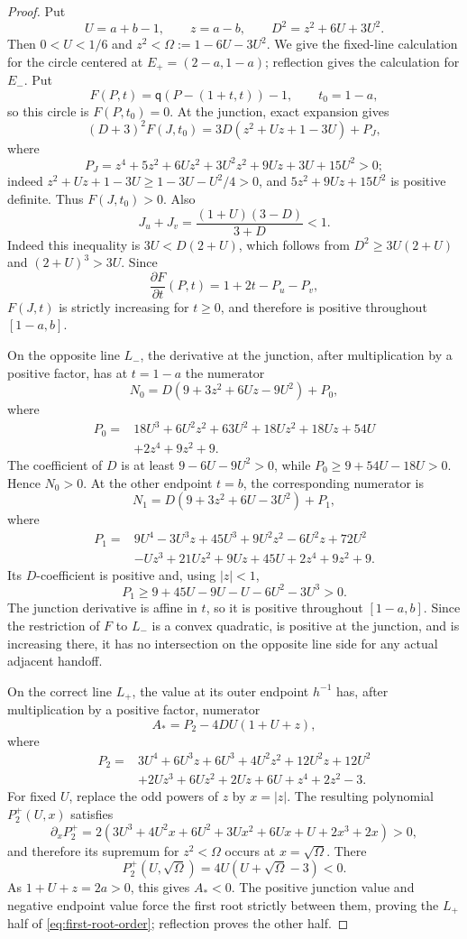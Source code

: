\begin{proof}
Put
\[
 U=a+b-1,\qquad z=a-b,\qquad
 D^2=z^2+6U+3U^2.
\]
Then $0<U<1/6$ and $z^2<\Omega:=1-6U-3U^2$.  We give the
fixed-line calculation for the circle centered at
$E_+=(2-a,1-a)$; reflection gives the calculation for $E_-$.  Put
\[
 F(P,t)=\mathsf q(P-(1+t,t))-1,\qquad t_0=1-a,
\]
so this circle is $F(P,t_0)=0$.  At the junction, exact expansion gives
\[
 (D+3)^2F(J,t_0)=3D(z^2+Uz+1-3U)+P_J,
\]
where
\[
 P_J=z^4+5z^2+6Uz^2+3U^2z^2+9Uz+3U+15U^2>0;
\]
indeed $z^2+Uz+1-3U\ge1-3U-U^2/4>0$, and
$5z^2+9Uz+15U^2$ is positive definite.  Thus $F(J,t_0)>0$.
Also
\[
 J_u+J_v=\frac{(1+U)(3-D)}{3+D}<1.
\]
Indeed this inequality is $3U<D(2+U)$, which follows from
$D^2\ge3U(2+U)$ and $(2+U)^3>3U$.  Since
\[
 \frac{\partial F}{\partial t}(P,t)=1+2t-P_u-P_v,
\]
$F(J,t)$ is strictly increasing for $t\ge0$, and therefore is positive
throughout $[1-a,b]$.

On the opposite line $L_-$, the derivative at the junction, after
multiplication by a positive factor, has at $t=1-a$ the numerator
\[
 N_0=D(9+3z^2+6Uz-9U^2)+P_0,
\]
where
\[
\begin{aligned}
 P_0={}&18U^3+6U^2z^2+63U^2+18Uz^2+18Uz+54U\\
      &+2z^4+9z^2+9.
\end{aligned}
\]
The coefficient of $D$ is at least $9-6U-9U^2>0$, while
$P_0\ge9+54U-18U>0$.  Hence $N_0>0$.  At the other endpoint $t=b$, the
corresponding numerator is
\[
 N_1=D(9+3z^2+6U-3U^2)+P_1,
\]
where
\[
\begin{aligned}
 P_1={}&9U^4-3U^3z+45U^3+9U^2z^2-6U^2z+72U^2\\
      &-Uz^3+21Uz^2+9Uz+45U+2z^4+9z^2+9.
\end{aligned}
\]
Its $D$-coefficient is positive and, using $|z|<1$,
\[
 P_1\ge9+45U-9U-U-6U^2-3U^3>0.
\]
The junction derivative is affine in $t$, so it is positive throughout
$[1-a,b]$.  Since the restriction of $F$ to $L_-$ is a convex quadratic,
is positive at the junction, and is increasing there, it has no intersection
on the opposite line side for any actual adjacent handoff.

On the correct line $L_+$, the value at its outer endpoint $h^{-1}$ has,
after multiplication by a positive factor, numerator
\[
 A_*=P_2-4DU(1+U+z),
\]
where
\[
\begin{aligned}
 P_2={}&3U^4+6U^3z+6U^3+4U^2z^2+12U^2z+12U^2\\
      &+2Uz^3+6Uz^2+2Uz+6U+z^4+2z^2-3.
\end{aligned}
\]
For fixed $U$, replace the odd powers of $z$ by $x=|z|$.  The resulting
polynomial $P_2^+(U,x)$ satisfies
\[
 \partial_xP_2^+
 =2(3U^3+4U^2x+6U^2+3Ux^2+6Ux+U+2x^3+2x)>0,
\]
and therefore its supremum for $z^2<\Omega$ occurs at $x=\sqrt\Omega$.
There
\[
 P_2^+(U,\sqrt\Omega)=4U(U+\sqrt\Omega-3)<0.
\]
As $1+U+z=2a>0$, this gives $A_*<0$.  The positive junction value and
negative endpoint value force the first root strictly between them, proving
the $L_+$ half of \eqref{eq:first-root-order}; reflection proves the other
half.


\end{proof}
